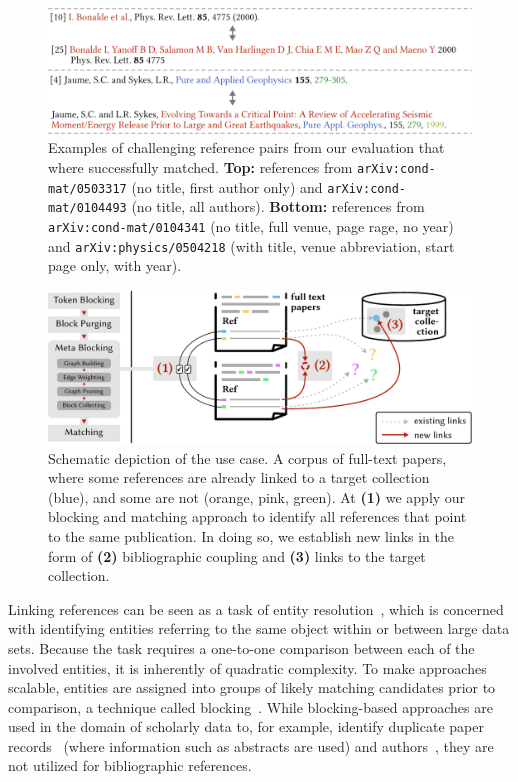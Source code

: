 \begin{figure}[tb]
  \centering
  \includegraphics[width=\linewidth]{figures/ref_covgran/hardmatch_examples.pdf}
  \caption[Examples of challenging reference pairs from our evaluation that where successfully matched]{Examples of challenging reference pairs from our evaluation that where successfully matched. \textbf{Top:} references from \texttt{arXiv:cond-mat/0503317} (no title, first author only) and \texttt{arXiv:cond-mat/0104493} (no title, all authors). \textbf{Bottom:} references from \texttt{arXiv:cond-mat/0104341} (no title, full venue, page rage, no year) and \texttt{arXiv:physics/0504218} (with title, venue abbreviation, start page only, with year).}
  \label{fig:hardmatch}
\end{figure}

\begin{figure}[tb]
  \centering
  \includegraphics[width=\linewidth]{figures/ref_covgran/approach_withblocking_10pvar.pdf}
  \caption[Schematic depiction of the use case]{Schematic depiction of the use case. A corpus of full-text papers, where some references are already linked to a target collection (blue), and some are not (orange, pink, green). At \textbf{(1)} we apply our blocking and matching approach to identify all references that point to the same publication. In doing so, we establish new links in the form of \textbf{(2)} bibliographic coupling and \textbf{(3)} links to the target collection.}
  \label{fig:approach}
\end{figure}

Linking references can be seen as a task of entity resolution~\cite{Christophides2015ERdef}, which is concerned with identifying entities referring to the same object within or between large data sets. Because the task requires a one-to-one comparison between each of the involved entities, it is inherently of quadratic complexity. To make approaches scalable, entities are assigned into groups of likely matching candidates prior to comparison, a technique called blocking~\cite{Papadakis2020survey}.
While blocking-based approaches are used in the domain of scholarly data to, for example, identify duplicate paper records~\cite{Simonini2016blast,Sefid2019,Lo2020} (where information such as abstracts are used) and authors~\cite{FaerberLin2022}, they are not utilized for bibliographic references.

